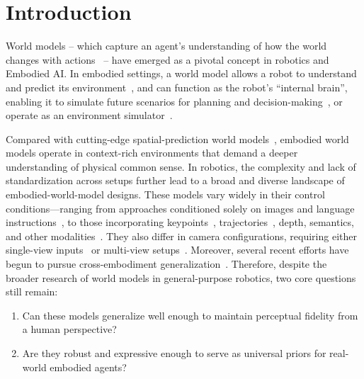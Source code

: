 \section{Introduction}
\label{sec:intro}

World models – which capture an agent’s understanding of how the world changes with actions~\cite{ha2018world} – have emerged as a pivotal concept in robotics and Embodied AI. In embodied settings, a world model allows a robot to understand and predict its environment~\cite{ding2025understanding,long2025survey,fung2025embodied,li2025comprehensive}, and can function as the robot’s “internal brain”, enabling it to simulate future scenarios for planning and decision-making~\cite{chi2025wow,unifolmwma2025,wang2023anypose,Ko2023Learning}, or operate as an environment simulator~\cite{li2025vla,xiao2025world,liao2025genieenvisionerunifiedworld}.

Compared with cutting-edge spatial-prediction world models~\cite{genie3,team2025hunyuanworld}, embodied world models operate in context-rich environments that demand a deeper understanding of physical common sense. In robotics, the complexity and lack of standardization across setups further lead to a broad and diverse landscape of embodied-world-model designs. These models vary widely in their control conditions—ranging from approaches conditioned solely on images and language instructions~\cite{unifolmwma2025, chi2024eva, chi2025wow, chi2025mindlearningdualsystemworld}, to those incorporating keypoints~\cite{wang2025language}, trajectories~\cite{li2025manipdreamer3d, fu2025learning, jiang2025enerverse, quevedo2025evaluating, cen2025worldvla, guo2025ctrl}, depth, semantics, and other modalities~\cite{yang2025orv, li2025manipdreamer, zhou2024robodreamer}. They also differ in camera configurations, requiring either single-view inputs~\cite{chi2024eva, zhu2024irasim, cen2025worldvla, fu2025learning, unifolmwma2025, quevedo2025evaluating, wang2025language, chi2025mindlearningdualsystemworld, li2025manipdreamer3d} or multi-view setups~\cite{pmlr-v202-seo23a, chen2025robohorizonllmassistedmultiviewworld, pang2025learning, chi2025wow, liao2025genieenvisionerunifiedworld, yang2025orv, guo2025ctrl}. Moreover, several recent efforts have begun to pursue cross-embodiment generalization~\cite{zhi20253dflowaction, he2025scaling, chi2025wow}.
Therefore, despite the broader research of world models in general-purpose robotics, two core questions still remain: 
\begin{enumerate}
    \item Can these models generalize well enough to maintain perceptual fidelity from a human perspective?
    \item Are they robust and expressive enough to serve as universal priors for real-world embodied agents?
\end{enumerate}

